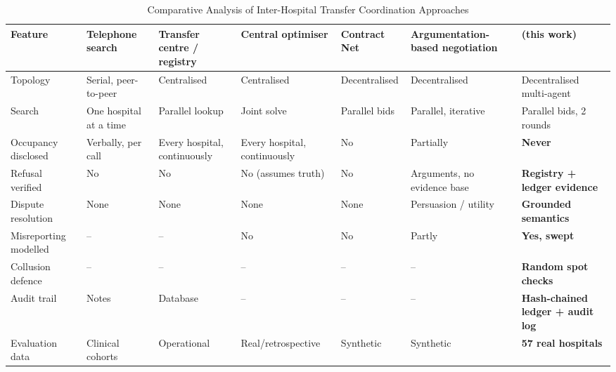 \begin{table}[!t]
\centering
\caption{Comparative Analysis of Inter-Hospital Transfer Coordination Approaches}
\label{tab:compare}
\footnotesize
\setlength{\tabcolsep}{3pt}
\begin{tabularx}{\textwidth}{@{}>{\raggedright\arraybackslash}p{2.6cm}*{6}{>{\raggedright\arraybackslash}X}@{}}
\toprule
Feature & Telephone search \cite{wong2015delays} & Transfer centre / registry \cite{villarroel2023surgeline} & Central optimiser \cite{dijkstra2023balancing,parker2020redistribution} & Contract Net \cite{smith1980contract} & Argumentation-based negotiation \cite{rahwan2003abn,amgoud2007unified} & \textbf{\mahros{} (this work)} \\
\midrule
Topology & Serial, peer-to-peer & Centralised & Centralised & Decentralised & Decentralised & Decentralised multi-agent \\
Search & One hospital at a time & Parallel lookup & Joint solve & Parallel bids & Parallel, iterative & Parallel bids, 2 rounds \\
Occupancy disclosed & Verbally, per call & Every hospital, continuously & Every hospital, continuously & No & Partially & \textbf{Never} \\
Refusal verified & No & No & No (assumes truth) & No & Arguments, no evidence base & \textbf{Registry + ledger evidence} \\
Dispute resolution & None & None & None & None & Persuasion / utility & \textbf{Grounded semantics} \\
Misreporting modelled & -- & -- & No & No & Partly & \textbf{Yes, swept} \\
Collusion defence & -- & -- & -- & -- & -- & \textbf{Random spot checks} \\
Audit trail & Notes & Database & -- & -- & -- & \textbf{Hash-chained ledger + audit log} \\
Evaluation data & Clinical cohorts & Operational & Real/retrospective & Synthetic & Synthetic & \textbf{57 real hospitals} \\
\bottomrule
\end{tabularx}
\end{table}
